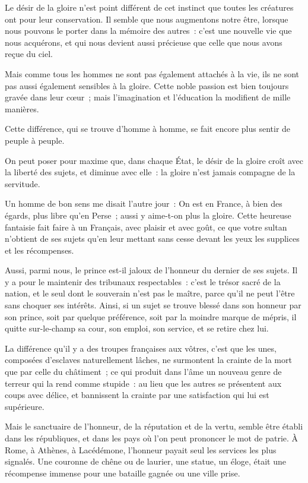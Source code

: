 \documentclass[french,twoside]{book} %
\begin{document}
\noindent Le désir de la gloire n’est point différent de cet instinct que toutes les créatures ont pour leur conservation. Il semble que nous augmentons notre être, lorsque nous pouvons le porter dans la mémoire des autres : c’est une nouvelle vie que nous acquérons, et qui nous devient aussi précieuse que celle que nous avons reçue du ciel.\par
Mais comme tous les hommes ne sont pas également attachés à la vie, ils ne sont pas aussi également sensibles à la gloire. Cette noble passion est bien toujours gravée dans leur cœur ; mais l’imagination et l’éducation la modifient de mille manières.\par
Cette différence, qui se trouve d’homme à homme, se fait encore plus sentir de peuple à peuple.\par
On peut poser pour maxime que, dans chaque État, le désir de la gloire croît avec la liberté des sujets, et diminue avec elle : la gloire n’est jamais compagne de la servitude.\par
Un homme de bon sens me disait l’autre jour : On est en France, à bien des égards, plus libre qu’en Perse ; aussi y aime-t-on plus la gloire. Cette heureuse fantaisie fait faire à un Français, avec plaisir et avec goût, ce que votre sultan n’obtient de ses sujets qu’en leur mettant sans cesse devant les yeux les supplices et les récompenses.\par
Aussi, parmi nous, le prince est-il jaloux de l’honneur du dernier de ses sujets. Il y a pour le maintenir des tribunaux respectables : c’est le trésor sacré de la nation, et le seul dont le souverain n’est pas le maître, parce qu’il ne peut l’être sans choquer ses intérêts. Ainsi, si un sujet se trouve blessé dans son honneur par son prince, soit par quelque préférence, soit par la moindre marque de mépris, il quitte sur-le-champ sa cour, son emploi, son service, et se retire chez lui.\par
La différence qu’il y a des troupes françaises aux vôtres, c’est que les unes, composées d’esclaves naturellement lâches, ne surmontent la crainte de la mort que par celle du châtiment ; ce qui produit dans l’âme un nouveau genre de terreur qui la rend comme stupide : au lieu que les autres se présentent aux coups avec délice, et bannissent la crainte par une satisfaction qui lui est supérieure.\par
Mais le sanctuaire de l’honneur, de la réputation et de la vertu, semble être établi dans les républiques, et dans les pays où l’on peut prononcer le mot de patrie. À Rome, à Athènes, à Lacédémone, l’honneur payait seul les services les plus signalés. Une couronne de chêne ou de laurier, une statue, un éloge, était une récompense immense pour une bataille gagnée ou une ville prise.\par
\end{document}
